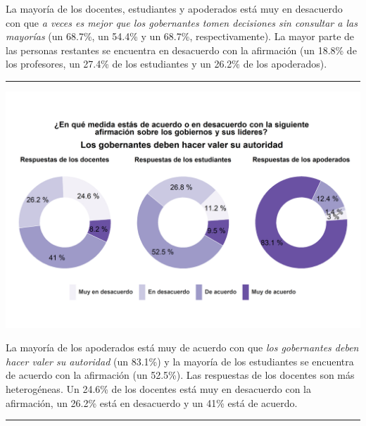 \documentclass[
  14pt,
]{book}
\let\origfigure\figure
\let\endorigfigure\endfigure
\renewenvironment{figure}[1][2] {
  \expandafter\origfigure\expandafter[H]
} {
  \endorigfigure
}
\begin{document}
La mayoría de los docentes, estudiantes y apoderados está muy en desacuerdo con que \emph{a veces es mejor que los gobernantes tomen decisiones sin consultar a las mayorías} (un 68.7\%, un 54.4\% y un 68.7\%, respectivamente). La mayor parte de las personas restantes se encuentra en desacuerdo con la afirmación (un 18.8\% de los profesores, un 27.4\% de los estudiantes y un 26.2\% de los apoderados).

\begin{center}\rule{0.5\linewidth}{0.5pt}\end{center}

\begin{figure}[!ht]

{\centering \includegraphics[width=0.8\linewidth,]{images/graph_aut5} 

}

\caption{Los gobernantes deben hacer valer su autoridad}\label{fig:unnamed-chunk-46}
\end{figure}

La mayoría de los apoderados está muy de acuerdo con que \emph{los gobernantes deben hacer valer su autoridad} (un 83.1\%) y la mayoría de los estudiantes se encuentra de acuerdo con la afirmación (un 52.5\%). Las respuestas de los docentes son más heterogéneas. Un 24.6\% de los docentes está muy en desacuerdo con la afirmación, un 26.2\% está en desacuerdo y un 41\% está de acuerdo.

\begin{center}\rule{0.5\linewidth}{0.5pt}\end{center}
\end{document}

